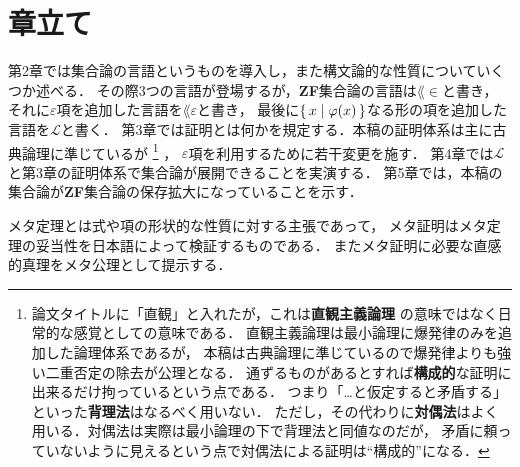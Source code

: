 \section{章立て}
	第2章では集合論の言語というものを導入し，また構文論的な性質についていくつか述べる．
	その際3つの言語が登場するが，{\bf ZF}集合論の言語は$\lang{\in}$と書き，
	それに$\varepsilon$項を追加した言語を$\lang{\varepsilon}$と書き，
	最後に$\{\, x \mid \varphi(x)\, \}$なる形の項を追加した言語を$\mathcal{L}$と書く．
	第3章では証明とは何かを規定する．本稿の証明体系は主に古典論理に準じているが
	\footnote{
		論文タイトルに「直観」と入れたが，これは{\bf 直観主義論理}
		の意味ではなく日常的な感覚としての意味である．
		直観主義論理は最小論理に爆発律のみを追加した論理体系であるが，
		本稿は古典論理に準じているので爆発律よりも強い二重否定の除去が公理となる．
		通ずるものがあるとすれば{\bf 構成的}な証明に出来るだけ拘っているという点である．
		つまり「…と仮定すると矛盾する」といった{\bf 背理法}はなるべく用いない．
		ただし，その代わりに{\bf 対偶法}はよく用いる．対偶法は実際は最小論理の下で背理法と同値なのだが，
		矛盾に頼っていないように見えるという点で対偶法による証明は``構成的''になる．
	}
	，
	$\varepsilon$項を利用するために若干変更を施す．
	第4章では$\mathcal{L}$と第3章の証明体系で集合論が展開できることを実演する．
	第5章では，本稿の集合論が{\bf ZF}集合論の保存拡大になっていることを示す．
	
	メタ定理とは式や項の形状的な性質に対する主張であって，
	メタ証明はメタ定理の妥当性を日本語によって検証するものである．
	またメタ証明に必要な直感的真理をメタ公理として提示する．
	
